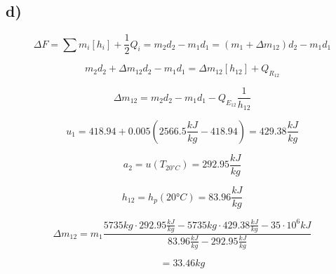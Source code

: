 

\subsection*{d)}

\[
\Delta F = \sum m_i [h_i] + \frac{1}{2} Q_i = m_2 d_2 - m_1 d_1 = (m_1 + \Delta m_{12}) d_2 - m_1 d_1
\]

\[
m_2 d_2 + \Delta m_{12} d_2 - m_1 d_1 = \Delta m_{12} [h_{12}] + Q_{R_{12}}
\]

\[
\Delta m_{12} = m_2 d_2 - m_1 d_1 - Q_{E_{12}} \frac{1}{h_{12}}
\]

\[
u_1 = 418.94 + 0.005 (2566.5 \frac{kJ}{kg} - 418.94) = 429.38 \frac{kJ}{kg}
\]

\[
a_2 = u(T_{20°C}) = 292.95 \frac{kJ}{kg}
\]

\[
h_{12} = h_p (20°C) = 83.96 \frac{kJ}{kg}
\]

\[
\Delta m_{12} = m_1 \frac{5735 kg \cdot 292.95 \frac{kJ}{kg} - 5735 kg \cdot 429.38 \frac{kJ}{kg} - 35 \cdot 10^6 kJ}{83.96 \frac{kJ}{kg} - 292.95 \frac{kJ}{kg}}
\]

\[
= 33.46 kg
\]